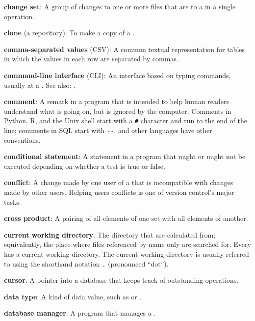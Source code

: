 \documentclass{book}
\begin{document}
\textbf{change set}: A group of changes to one or more files that are
 to a   in a single operation.

\textbf{clone} (a repository): To make a copy of a
.

\textbf{comma-separated values} (CSV): A common textual representation
for tables in which the values in each row are separated by commas.

\textbf{command-line interface} (CLI): An interface based on typing
commands, usually at a . See also:
.

\textbf{comment}: A remark in a program that is intended to help human
readers understand what is going on, but is ignored by the computer.
Comments in Python, R, and the Unix shell start with a \texttt{\#}
character and run to the end of the line; comments in SQL start with
\texttt{-{}-}, and other languages have other conventions.

\textbf{conditional statement}: A statement in a program that might or
might not be executed depending on whether a test is true or false.

\textbf{conflict}: A change made by one user of a
 that is
incompatible with changes made by other users. Helping users
 conflicts is one of version control's
major tasks.

\textbf{cross product}: A pairing of all elements of one set with all
elements of another.

\textbf{current working directory}: The directory that
 are calculated from;
equivalently, the place where files referenced by name only are searched
for. Every  has a current working
directory. The current working directory is usually referred to using
the shorthand notation \texttt{.} (pronounced ``dot'').

\textbf{cursor}: A pointer into a database that keeps track of
outstanding operations.

\textbf{data type}: A kind of data value, such as
 or .

\textbf{database manager}: A program that manages a
.
\end{document}
